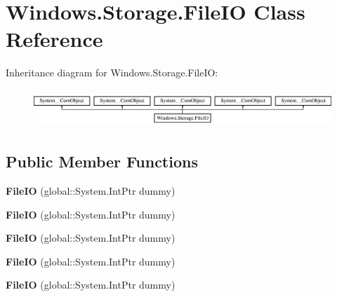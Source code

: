 \hypertarget{class_windows_1_1_storage_1_1_file_i_o}{}\section{Windows.\+Storage.\+File\+IO Class Reference}
\label{class_windows_1_1_storage_1_1_file_i_o}
Inheritance diagram for Windows.\+Storage.\+File\+IO\+:\begin{figure}[H]
\begin{center}
\leavevmode
\includegraphics[height=1.435897cm]{class_windows_1_1_storage_1_1_file_i_o}
\end{center}
\end{figure}
\subsection*{Public Member Functions}
\begin{DoxyCompactItemize}
\item 
\mbox{\label{class_windows_1_1_storage_1_1_file_i_o_af21ff654f1636663a105d73730c3d7ae}} 
{\bfseries File\+IO} (global\+::\+System.\+Int\+Ptr dummy)
\item 
\mbox{\label{class_windows_1_1_storage_1_1_file_i_o_af21ff654f1636663a105d73730c3d7ae}} 
{\bfseries File\+IO} (global\+::\+System.\+Int\+Ptr dummy)
\item 
\mbox{\label{class_windows_1_1_storage_1_1_file_i_o_af21ff654f1636663a105d73730c3d7ae}} 
{\bfseries File\+IO} (global\+::\+System.\+Int\+Ptr dummy)
\item 
\mbox{\label{class_windows_1_1_storage_1_1_file_i_o_af21ff654f1636663a105d73730c3d7ae}} 
{\bfseries File\+IO} (global\+::\+System.\+Int\+Ptr dummy)
\item 
\mbox{\label{class_windows_1_1_storage_1_1_file_i_o_af21ff654f1636663a105d73730c3d7ae}} 
{\bfseries File\+IO} (global\+::\+System.\+Int\+Ptr dummy)
\end{DoxyCompactItemize}

